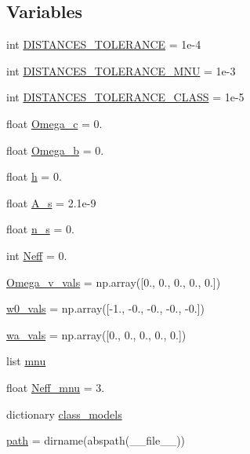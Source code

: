 \subsection*{Variables}
\begin{DoxyCompactItemize}
\item 
int \mbox{\hyperlink{namespaceccl__test__distances_a24d703f3624b8dbed19048286420f986}{D\+I\+S\+T\+A\+N\+C\+E\+S\+\_\+\+T\+O\+L\+E\+R\+A\+N\+CE}} = 1e-\/4
\item 
int \mbox{\hyperlink{namespaceccl__test__distances_a5f8c7c48eb6f00fecddfacef60daece3}{D\+I\+S\+T\+A\+N\+C\+E\+S\+\_\+\+T\+O\+L\+E\+R\+A\+N\+C\+E\+\_\+\+M\+NU}} = 1e-\/3
\item 
int \mbox{\hyperlink{namespaceccl__test__distances_a1ca232f4f29884f49cac06c8238573fd}{D\+I\+S\+T\+A\+N\+C\+E\+S\+\_\+\+T\+O\+L\+E\+R\+A\+N\+C\+E\+\_\+\+C\+L\+A\+SS}} = 1e-\/5
\item 
float \mbox{\hyperlink{namespaceccl__test__distances_af043eb3c72e09eb5d61c07d8ae053b23}{Omega\+\_\+c}} = 0.
\item 
float \mbox{\hyperlink{namespaceccl__test__distances_ab9ebb83b3405642c411447bff8d1cdfa}{Omega\+\_\+b}} = 0.
\item 
float \mbox{\hyperlink{namespaceccl__test__distances_a6657d9200f3deee33876fcfbe909ad0b}{h}} = 0.
\item 
float \mbox{\hyperlink{namespaceccl__test__distances_a4fee99b90c7ad9e42ac56246005f2f99}{A\+\_\+s}} = 2.\+1e-\/9
\item 
float \mbox{\hyperlink{namespaceccl__test__distances_abad4b55ea71dc4c136de2741294d10f3}{n\+\_\+s}} = 0.
\item 
int \mbox{\hyperlink{namespaceccl__test__distances_a23a5c8a12ec37f9ca3d0dc89fe1ae297}{Neff}} = 0.
\item 
\mbox{\hyperlink{namespaceccl__test__distances_a12765193e04eba1a445ea1429b656ef8}{Omega\+\_\+v\+\_\+vals}} = np.\+array(\mbox{[}0., 0., 0., 0., 0.\mbox{]})
\item 
\mbox{\hyperlink{namespaceccl__test__distances_a3cd2fd2656b01e8fa9d3b3b1905570b4}{w0\+\_\+vals}} = np.\+array(\mbox{[}-\/1., -\/0., -\/0., -\/0., -\/0.\mbox{]})
\item 
\mbox{\hyperlink{namespaceccl__test__distances_aa22d23c41d186cbb885841df67b5eaa2}{wa\+\_\+vals}} = np.\+array(\mbox{[}0., 0., 0., 0., 0.\mbox{]})
\item 
list \mbox{\hyperlink{namespaceccl__test__distances_a8e0e0198ea990e29a05cea77a670f0ab}{mnu}}
\item 
float \mbox{\hyperlink{namespaceccl__test__distances_ae8ad2b14dae691b68145cfe94510ef92}{Neff\+\_\+mnu}} = 3.
\item 
dictionary \mbox{\hyperlink{namespaceccl__test__distances_aa4dc8e28781426ffe326155879104cfb}{class\+\_\+models}}
\item 
\mbox{\hyperlink{namespaceccl__test__distances_a0efd8d1ec41a705ef9b76669b8514033}{path}} = dirname(abspath(\+\_\+\+\_\+file\+\_\+\+\_\+))
\end{DoxyCompactItemize}



